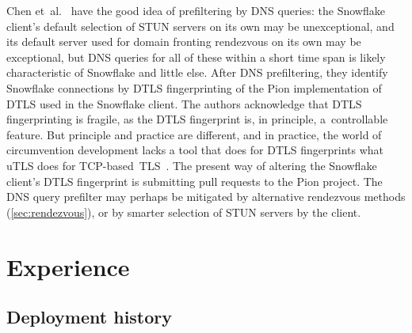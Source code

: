 \documentclass[letterpaper,twocolumn]{article}
\begin{document}
Chen et~al.~\cite{Chen2023a}
have the good idea of prefiltering by DNS queries:
the Snowflake client's default selection of STUN servers
on its own may be unexceptional,
and its default server used for domain fronting rendezvous
on its own may be exceptional,
but DNS queries for all of these within a short time span
is likely characteristic of Snowflake and little else.
After DNS prefiltering, they identify Snowflake connections
by DTLS fingerprinting of the Pion implementation of DTLS
used in the Snowflake client.
The authors acknowledge that DTLS fingerprinting
is fragile, as the DTLS fingerprint is, in principle,
a~controllable feature.
But principle and practice are different,
and in practice,
the world of circumvention development
lacks a tool that does for DTLS fingerprints
what uTLS does for TCP-based~TLS~\cite[\S VII]{Frolov2019a}.
The present way of altering the Snowflake client's DTLS fingerprint
is submitting pull requests to the Pion project.
The DNS query prefilter may perhaps be mitigated
by alternative rendezvous methods (\autoref{sec:rendezvous}),
or by smarter selection of STUN servers by the client.


\section{Experience}
\label{sec:experience}

\subsection{Deployment history}
\end{document}
